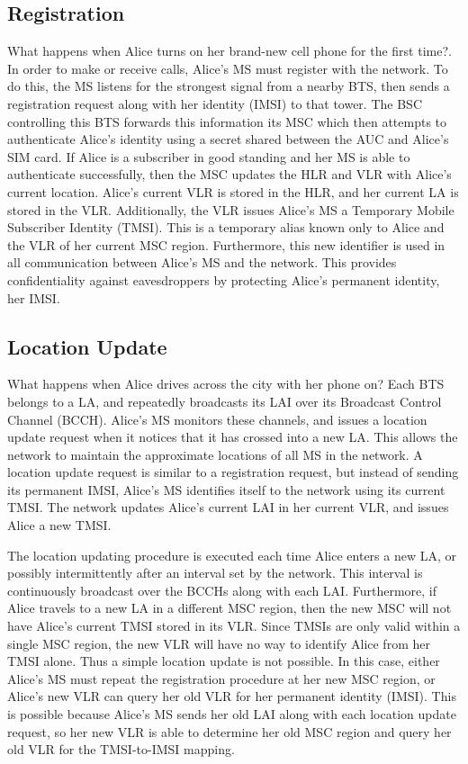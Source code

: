 \documentclass[11pt]{article}
\begin{document}

\subsection{Registration}
What happens when Alice turns on her brand-new cell phone for the first time?. In order to make or receive calls, Alice's MS must register with the network. To do this, the MS listens for the strongest signal from a nearby BTS, then sends a registration request along with her identity (IMSI) to that tower. The BSC controlling this BTS forwards this information its MSC which then attempts to authenticate Alice's identity using a secret shared between the AUC and Alice's SIM card. If Alice is a subscriber in good standing and her MS is able to authenticate successfully, then the MSC updates the HLR and VLR with Alice's current location. Alice's current VLR is stored in the HLR, and her current LA is stored in the VLR. Additionally, the VLR issues Alice's MS a Temporary Mobile Subscriber Identity (TMSI). This is a temporary alias known only to Alice and the VLR of her current MSC region. Furthermore, this new identifier is used in all communication between Alice's MS and the network. This provides confidentiality against eavesdroppers by protecting Alice's permanent identity, her IMSI. 

\subsection{Location Update}
What happens when Alice drives across the city with her phone on? Each BTS belongs to a LA, and repeatedly broadcasts its LAI over its Broadcast Control Channel (BCCH). Alice's MS monitors these channels, and issues a location update request when it notices that it has crossed into a new LA. This allows the network to maintain the approximate locations of all MS in the network. A location update request is similar to a registration request, but instead of sending its permanent IMSI, Alice's MS identifies itself to the network using its current TMSI. The network updates Alice's current LAI in her current VLR, and issues Alice a new TMSI.

The location updating procedure is executed each time Alice enters a new LA, or possibly intermittently after an interval set by the network. This interval is continuously broadcast over the BCCHs along with each LAI. Furthermore, if Alice travels to a new LA in a different MSC region, then the new MSC will not have Alice's current TMSI stored in its VLR. Since TMSIs  are only valid within a single MSC region, the new VLR will have no way to identify Alice from her TMSI alone. Thus a simple location update is not possible. In this case, either Alice's MS must repeat the registration procedure at her new MSC region, or Alice's new VLR can query her old VLR for her permanent identity (IMSI). This is possible because Alice's MS sends her old LAI along with each location update request, so her new VLR is able to determine her old MSC region and query her old VLR for the TMSI-to-IMSI mapping. 
\end{document}
